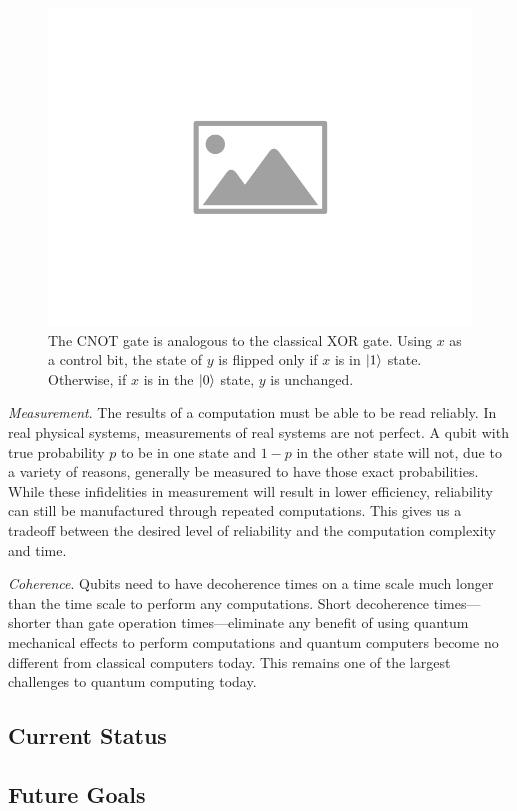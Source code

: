 \begin{figure}[htbp]
    \centering
    \includegraphics[width=0.75\columnwidth]{placeholder-image}
    \caption[The CNOT gate.]{The CNOT gate is analogous to the classical XOR gate. Using $x$ as a control bit, the state of $y$ is flipped only if $x$ is in $\ket{1}$ state. Otherwise, if $x$ is in the $\ket{0}$ state, $y$ is unchanged.}
    \label{FIG:cnot_gate}
\end{figure}

\emph{Measurement}. The results of a computation must be able to be read reliably.
In real physical systems, measurements of real systems are not perfect. A qubit with true probability $p$ to be in one state and $1-p$ in the other state will not, due to a variety of reasons, generally be measured to have those exact probabilities.
While these infidelities in measurement will result in lower efficiency, reliability can still be manufactured through repeated computations.
This gives us a tradeoff between the desired level of reliability and the computation complexity and time.


\emph{Coherence}. Qubits need to have decoherence times on a time scale much longer than the time scale to perform any computations.
Short decoherence times---shorter than gate operation times---eliminate any benefit of using quantum mechanical effects to perform computations and quantum computers become no different from classical computers today.
This remains one of the largest challenges to quantum computing today.

\subsection{Current Status}
\subsection{Future Goals}